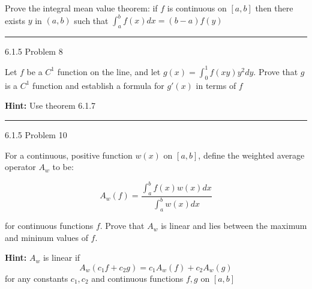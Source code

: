 \documentclass[11pt]{article}
\begin{document}
Prove the integral mean value theorem: if $f$ is continuous on $[a,b]$ then there exists $y$ in $(a,b)$ 
such that $\int_a ^b f(x) dx = (b - a)f(y)$
\hrule








 6.1.5 Problem 8

Let $f$ be a $C^1$ function on the line, and let $g(x) = \int_0 ^1 f(xy)y^2 dy$.
Prove that $g$ is a $C^1$ function and establish a formula for $g'(x)$ in terms of $f$

\textbf{Hint:} Use theorem 6.1.7
\hrule





 6.1.5 Problem 10

For a continuous, positive function $w(x)$ on $[a,b]$, define the weighted average operator $A_w$ to be:

$$A_w(f) = \frac{ \int_a ^b f(x) w(x) dx }{ \int_a ^b w(x) dx}$$

for continuous functions $f$. Prove that $A_w$ is linear and lies between the maximum and mininum values of $f$.

\textbf{Hint:} $A_w$ is linear if
$$A_w (c_1 f + c_2 g) = c_1 A_w (f) + c_2 A_w (g)$$
for any constants $c_1, c_2$ and continuous functions $f,g$ on $[a,b]$
\end{document}
